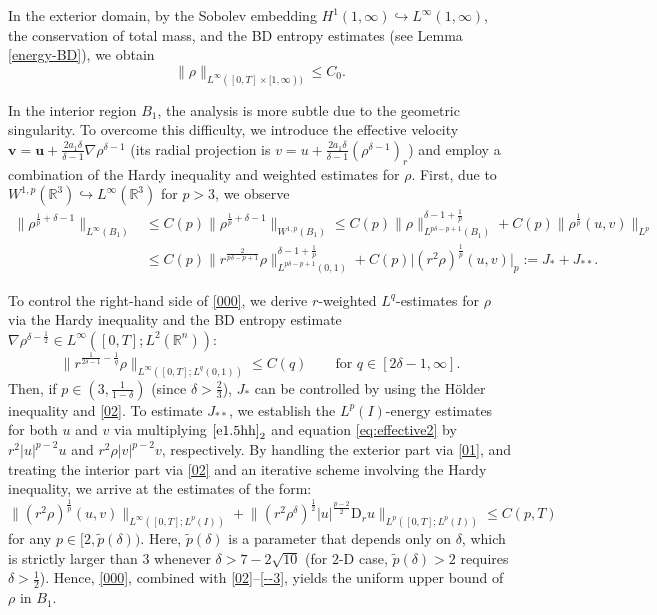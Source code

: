 \documentclass[11pt,reqno]{amsart}
\numberwithin{rk}{section}
\numberwithin{prop}{section}
\numberwithin{mydef}{section}
\numberwithin{lem}{section}
\numberwithin{equation}{section}
\numberwithin{thm}{section}
\begin{document}
In the exterior domain, by the Sobolev embedding $H^1(1,\infty)\hookrightarrow L^\infty(1,\infty)$, the conservation of total mass, and the BD entropy estimates (see Lemma \ref{energy-BD}), we obtain
\begin{equation}\label{01}
\|\rho\|_{L^\infty([0,T]\times [1,\infty))}\leq C_0.
\end{equation}

In the interior region $B_1$, the analysis is more subtle due to the geometric singularity. To overcome this difficulty, we introduce the effective velocity $\boldsymbol{v}=\boldsymbol{u}+\frac{2a_1\delta}{\delta-1}\nabla\rho^{\delta-1}$ (its radial projection is $v=u+\frac{2a_1\delta}{\delta-1}(\rho^{\delta-1})_r$) and employ a combination of the Hardy inequality and weighted estimates for $\rho$. First, due to  $W^{1,p}(\mathbb{R}^3)\hookrightarrow L^\infty(\mathbb{R}^3)$ for $p>3$, we observe
\begin{equation}\label{000}
\begin{aligned}
\|\rho^{\frac{1}{p}+\delta-1}\|_{L^\infty(B_1)}&\leq C(p)\|\rho^{\frac{1}{p}+\delta-1}\|_{W^{1,p}(B_1)} \leq C(p)\|\rho\|_{L^{p\delta-p+1}(B_1)}^{\delta-1+\frac{1}{p}}+C(p)\big\|\rho^{\frac{1}{p}}(u,v)\big\|_{L^p}\\
&\leq C(p)\|r^\frac{2}{p\delta-p+1}\rho\|_{L^{p\delta-p+1}(0,1)}^{\delta-1+\frac{1}{p}}+C(p)\big |(r^2\rho)^{\frac{1}{p}}(u,v)\big |_{p}:=J_*+J_{**}.
\end{aligned}   
\end{equation}

To control the right-hand side of \eqref{000}, we derive $r$-weighted $L^q$-estimates for $\rho$ via the Hardy inequality and the BD entropy estimate $\nabla\rho^{\delta-\frac{1}{2}}\in L^\infty([0,T];L^2(\mathbb{R}^n))$:
\begin{equation}\label{02}
\big\|r^{\frac{1}{2\delta-1}-\frac{1}{q}}\rho\big\|_{L^\infty([0,T];L^q(0,1))}\leq C(q) \qquad \text{for $q\in [2\delta-1,\infty]$}.
\end{equation}
Then, if $p\in (3,\frac{1}{1-\delta})$ (since $\delta>\frac{2}{3}$), $J_*$ can be controlled by using the H\"older inequality and \eqref{02}. To estimate $J_{**}$, we establish the $L^p(I)$-energy estimates for both $u$ and $v$ via multiplying $\eqref{e1.5hh}_2$ and equation \eqref{eq:effective2} by $r^2|u|^{p-2}u$ and $r^2\rho|v|^{p-2}v$, respectively. By handling the exterior part via \eqref{01}, and treating the interior part via \eqref{02} and an iterative scheme involving the Hardy inequality, we arrive at the estimates of the form:
\begin{equation}\label{--3}
\big\|(r^2\rho)^{\frac{1}{p}}(u,v)\big\|_{L^\infty([0,T];L^p(I))}+ \big\|(r^2\rho^\delta)^\frac{1}{2}|u|^\frac{p-2}{2}\mathrm{D}_ru\big\|_{L^p([0,T];L^p(I))} \leq C(p,T) 
\end{equation}
for any $p\in [2,\tilde{p}(\delta))$. Here, $\tilde{p}(\delta)$ is a parameter that depends only  on $\delta$, which is strictly larger than $3$ whenever $\delta>7-2\sqrt{10}$ (for $2$-D case, $\tilde{p}(\delta)>2$ requires $\delta>\frac{1}{2}$). Hence,  \eqref{000}, combined with \eqref{02}--\eqref{--3}, yields  the uniform upper bound of $\rho$ in  $B_1$.
\end{document}
